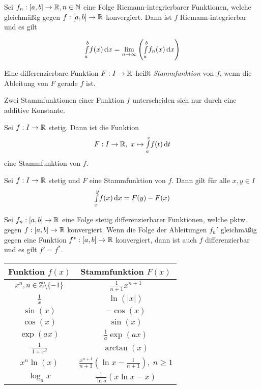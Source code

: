 \documentclass{cheat-sheet}
\begin{document}
\begin{satz}
Sei $f_n : [a, b] \to \mathbb{R}, n \in \mathbb{N}$ eine Folge Riemann-integrierbarer Funktionen, welche gleichmäßig gegen $f : [a, b] \to \mathbb{R}$ konvergiert. Dann ist $f$ Riemann-integrierbar und es gilt

\[ {\textstyle \int\limits_{a}^{b}} f(x) \,\mathrm{d} x = \lim_{n \to \infty} \left({\textstyle \int\limits_{a}^{b}} f_n(x) \,\mathrm{d} x \right) \]
\end{satz}

\begin{defn}
Eine differenzierbare Funktion $F: I \to \mathbb{R}$ heißt \emph{Stammfunktion} von $f$, wenn die Ableitung von $F$ gerade $f$ ist.
\end{defn}

\begin{bem}
Zwei Stammfunktionen einer Funktion $f$ unterscheiden sich nur durch eine additive Konstante.
\end{bem}

\begin{satz}
Sei $f : I \to \mathbb{R}$ stetig. Dann ist die Funktion
\[ F : I \to \mathbb{R},\ x \mapsto {\textstyle \int\limits_{a}^{x}} f(t) \,\mathrm{d} t \]
eine Stammfunktion von $f$.
\end{satz}

\begin{satz}
Sei $f : I \to \mathbb{R}$ stetig und $F$ eine Stammfunktion von $f$. Dann gilt für alle $x, y \in I$
\[ {\textstyle \int\limits_{x}^{y}} f(x) \,\mathrm{d} x = F(y) - F(x) \]
\end{satz}

\begin{satz}
Sei $f_n : [a, b] \to \mathbb{R}$ eine Folge stetig differenzierbarer Funktionen, welche pktw. gegen $f : [a, b] \to \mathbb{R}$ konvergiert. Wenn die Folge der Ableitungen $f_n'$ gleichmäßig gegen eine Funktion $f^{*} : [a, b] \to \mathbb{R}$ konvergiert, dann ist auch $f$ differenzierbar und es gilt $f' = f^{*}$.
\end{satz}

\center
\begin{tabular}{ | c | c | }
  \hline
  Funktion $f(x)$ & Stammfunktion $F(x)$ \\ \hline \hline
  $x^n, n \in \mathbb{Z}\backslash\{-1\}$ & $\tfrac{1}{n+1}x^{n+1}$ \\ \hline
  $\tfrac{1}{x}$ & $\ln(|x|)$ \\ \hline
  $\sin(x)$ & $-\cos(x)$ \\ \hline
  $\cos(x)$ & $\sin(x)$ \\ \hline
  $\exp(ax)$ & $\tfrac{1}{a}\exp(ax)$ \\ \hline
  $\tfrac{1}{1 + x^2}$ & $\arctan(x)$ \\ \hline
  $x^n \ln(x)$ & $\tfrac{x^{n+1}}{n+1}(\ln x - \tfrac{1}{n+1}),\ n \ge 1$ \\ \hline
  $\log_a x$ & $\tfrac{1}{\ln a}(x \ln x - x)$ \\ \hline
\end{tabular}
\end{document}
